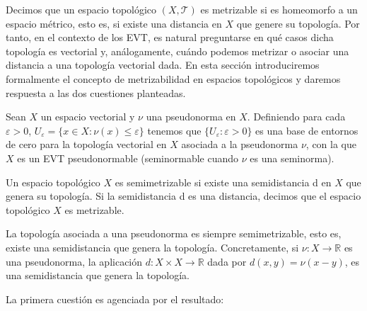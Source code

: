 

Decimos que un espacio topológico $(X,\mathcal{T})$ es metrizable si es homeomorfo a un espacio métrico, esto es, si existe una distancia en $X$ que genere su topología. Por tanto, en el contexto de los EVT, es natural preguntarse en qué casos dicha topología es vectorial y, análogamente, cuándo podemos metrizar o asociar una distancia a una topología vectorial dada. En esta sección introduciremos formalmente el concepto de metrizabilidad en espacios topológicos y daremos respuesta a las dos cuestiones planteadas.

\begin{definicion}
Sean $X$ un espacio vectorial y $\nu$ una pseudonorma en $X$. Definiendo para cada $\varepsilon > 0$, $U_{\varepsilon} = \{ x\in X : \nu (x) \leq \varepsilon \}$ tenemos que $\{U_{\varepsilon} : \varepsilon > 0 \}$ es una base de entornos de cero para la topología vectorial en $X$ asociada a la pseudonorma $\nu$, con la que $X$ es un EVT pseudonormable (seminormable cuando $\nu$ es una seminorma). 
\end{definicion}

\begin{definicion}
Un espacio topológico $X$ es semimetrizable si existe una semidistancia d en $X$ que genera su topología. Si la semidistancia d es una distancia, decimos que el espacio topológico $X$ es metrizable. 
\end{definicion}

\begin{observacion}
La topología asociada a una pseudonorma es siempre semimetrizable, esto es, existe una semidistancia que genera la topología. Concretamente, si $\nu : X \rightarrow \mathds{R}$ es una pseudonorma, la aplicación $d : X \times X \rightarrow \mathds{R} $ dada por $d(x,y) = \nu (x-y)$, es una semidistancia que genera la topología. 
\end{observacion}


La primera cuestión es agenciada por el resultado:

